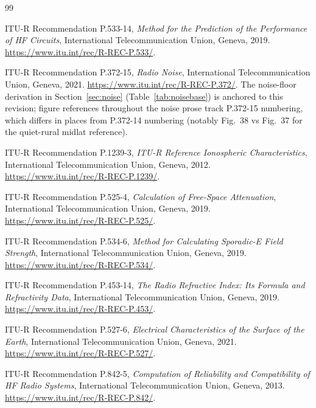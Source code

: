 \documentclass[11pt,a4paper]{article}
\begin{document}
\label{sec:refs}

\begin{thebibliography}{99}

  ITU-R Recommendation P.533-14,
  \emph{Method for the Prediction of the Performance of HF Circuits},
  International Telecommunication Union, Geneva, 2019.
  \url{https://www.itu.int/rec/R-REC-P.533/}.

  ITU-R Recommendation P.372-15,
  \emph{Radio Noise},
  International Telecommunication Union, Geneva, 2021.
  \url{https://www.itu.int/rec/R-REC-P.372/}.
  The noise-floor derivation in
  Section~\ref{sec:noise} (Table~\ref{tab:noisebase}) is anchored
  to this revision; figure references throughout the noise
  prose track P.372-15 numbering, which differs in places from
  P.372-14 numbering (notably Fig.~38 vs Fig.~37 for
  the quiet-rural midlat reference).

  ITU-R Recommendation P.1239-3,
  \emph{ITU-R Reference Ionospheric Characteristics},
  International Telecommunication Union, Geneva, 2012.
  \url{https://www.itu.int/rec/R-REC-P.1239/}.

  ITU-R Recommendation P.525-4,
  \emph{Calculation of Free-Space Attenuation},
  International Telecommunication Union, Geneva, 2019.
  \url{https://www.itu.int/rec/R-REC-P.525/}.

  ITU-R Recommendation P.534-6,
  \emph{Method for Calculating Sporadic-E Field Strength},
  International Telecommunication Union, Geneva, 2019.
  \url{https://www.itu.int/rec/R-REC-P.534/}.

  ITU-R Recommendation P.453-14,
  \emph{The Radio Refractive Index: Its Formula and Refractivity Data},
  International Telecommunication Union, Geneva, 2019.
  \url{https://www.itu.int/rec/R-REC-P.453/}.

  ITU-R Recommendation P.527-6,
  \emph{Electrical Characteristics of the Surface of the Earth},
  International Telecommunication Union, Geneva, 2021.
  \url{https://www.itu.int/rec/R-REC-P.527/}.

  ITU-R Recommendation P.842-5,
  \emph{Computation of Reliability and Compatibility of HF Radio Systems},
  International Telecommunication Union, Geneva, 2013.
  \url{https://www.itu.int/rec/R-REC-P.842/}.


\end{thebibliography}
\end{document}
